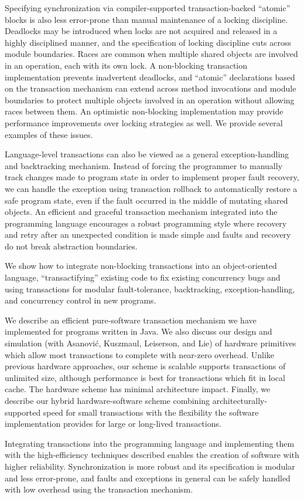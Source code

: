 \documentclass[twoside,twocolumn,notitlepage,letterpaper]{article}
\begin{document}
Specifying synchronization via compiler-supported transaction-backed
``atomic'' blocks is also less error-prone than manual maintenance of
a locking discipline.  Deadlocks may be introduced when locks are not
acquired and released in a highly disciplined manner, and the
specification of locking discipline cuts across module boundaries.
Races are common when multiple shared objects are involved in an
operation, each with its own lock.  A non-blocking transaction
implementation prevents inadvertent deadlocks, and ``atomic''
declarations based on the transaction mechanism can extend across
method invocations and module boundaries to protect multiple objects
involved in an operation without allowing races between them.  An
optimistic non-blocking implementation may provide performance
improvements over locking strategies as well.  We provide several
examples of these issues.

Language-level transactions can also be viewed as a general
exception-handling and backtracking mechanism.  Instead of forcing the
programmer to manually track changes made to program state in order to
implement proper fault recovery, we can handle the exception using
transaction rollback to automatically restore a safe program state,
even if the fault occurred in the middle of mutating shared objects.
An efficient and graceful transaction mechanism integrated into the
programming language encourages a robust programming style where
recovery and retry after an unexpected condition is made simple and
faults and recovery do not break abstraction boundaries.

We show how to integrate non-blocking transactions into an
object-oriented language, ``transactifying'' existing code to fix
existing concurrency bugs and using transactions for modular fault-tolerance,
backtracking, exception-handling, and concurrency control in new
programs.

We describe an efficient pure-software transaction mechanism we have
implemented for programs written in Java.  We also discuss our design
and simulation (with Asanovi\'c, Kuszmaul, Leiserson, and Lie) of
hardware primitives which allow most transactions to complete with
near-zero overhead.  Unlike previous hardware approaches, our scheme
is scalable supports transactions of unlimited size, although
performance is best for transactions which fit in local cache.  The
hardware scheme has minimal architecture impact.  Finally, we describe
our hybrid hardware-software scheme combining
architecturally-supported speed for small transactions with the
flexibility the software implementation provides for large or
long-lived transactions.

Integrating transactions into the programming language and
implementing them with the high-efficiency techniques described
enables the creation of software with higher reliability.
Synchronization is more robust and its specification is modular and less
error-prone, and faults and exceptions in general can be safely handled
with low overhead using the transaction mechanism.

%
%
\end{document}
